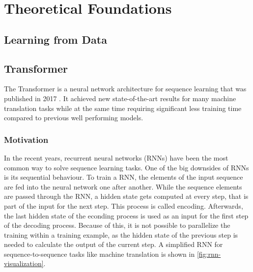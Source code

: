 \chapter{Theoretical Foundations}\label{ch:theoretical-foundations}

\Blindtext


\section{Learning from Data}

\Blindtext


\section{Transformer}\label{sec:transformer}

The Transformer is a neural network architecture for sequence learning that was published in 2017 \cite{1706.03762}.
It achieved new state-of-the-art results for many machine translation tasks while at the same time requiring significant less training time compared to previous well performing models.

\subsection{Motivation}\label{ssec:transformer-motivation}

In the recent years, recurrent neural networks (RNNs) have been the most common way to solve sequence learning tasks.
One of the big downsides of RNNs is its sequential behaviour.
To train a RNN, the elements of the input sequence are fed into the neural network one after another.
While the sequence elements are passed through the RNN, a hidden state gets computed at every step, that is part of the input for the next step.
This process is called encoding.
Afterwards, the last hidden state of the econding process is used as an input for the first step of the decoding process.
Because of this, it is not possible to parallelize the training within a training example, as the hidden state of the previous step is needed to calculate the output of the current step. \cite[p.~2]{1706.03762}
A simplified RNN for sequence-to-sequence tasks like machine translation is shown in \cref{fig:rnn-visualization}.

